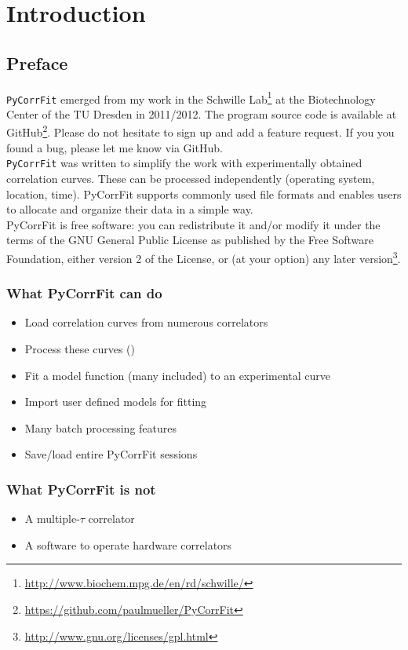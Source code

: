 \section{Introduction}

\subsection{Preface}
\texttt{PyCorrFit} emerged from my work in the Schwille Lab\footnote{\url{http://www.biochem.mpg.de/en/rd/schwille/}} at the Biotechnology Center of the TU Dresden in 2011/2012. The program source code is available at GitHub\footnote{\url{https://github.com/paulmueller/PyCorrFit}}. Please do not hesitate to sign up and add a feature request. If you you found a bug, please let me know via GitHub.\\

\noindent \texttt{PyCorrFit} was written to simplify the work with experimentally obtained correlation curves. These can be processed independently (operating system, location, time). PyCorrFit supports commonly used file formats and enables users to allocate and organize their data in a simple way.\\

\noindent PyCorrFit is free software: you can redistribute it and/or modify it
under the terms of the GNU General Public License as published 
by the Free Software Foundation, either version 2 of the License, 
or (at your option) any later version\footnote{\url{http://www.gnu.org/licenses/gpl.html}}.

\subsubsection*{What PyCorrFit can do}
\begin{itemize}
\item Load correlation curves from numerous correlators
\item Process these curves ()
\item Fit a model function (many included) to an experimental curve
\item Import user defined models for fitting
\item Many batch processing features
\item Save/load entire PyCorrFit sessions
\end{itemize}

\subsubsection*{What PyCorrFit is not}
\begin{itemize}
\item A multiple-$\tau$ correlator
\item A software to operate hardware correlators
\end{itemize}

